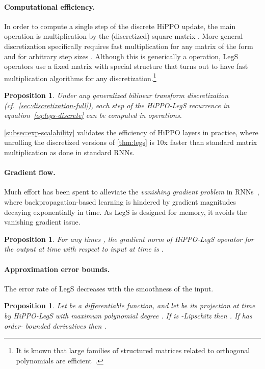 \documentclass{article}
\newtheorem{proposition}[theorem]{Proposition}
\begin{document}
\paragraph{Computational efficiency.}
In order to compute a single step of the discrete HiPPO update, the main operation is multiplication by the (discretized) square matrix .
More general discretization specifically requires fast multiplication for any matrix of the form  and  for arbitrary step sizes .
Although this is generically a  operation, LegS operators use a fixed  matrix with special structure
that turns out to have fast multiplication algorithms for any discretization.\footnote{It is known that large families of structured matrices related to orthogonal polynomials are efficient~\cite{de2018two}.}
\begin{proposition}\label{prop:efficiency}
    Under any generalized bilinear transform discretization (cf.\
    \cref{sec:discretization-full}), each step of the HiPPO-LegS recurrence in equation~\eqref{eq:legs-discrete} can be computed in  operations.
\end{proposition}

\cref{subsec:exp-scalability} validates the efficiency of HiPPO layers in practice, where unrolling the discretized versions of \cref{thm:legs} is 10x faster than standard matrix multiplication as done in standard RNNs.

\paragraph{Gradient flow.}
Much effort has been spent to alleviate the \emph{vanishing gradient problem} in RNNs~\cite{pascanu2013difficulty},
where backpropagation-based learning is hindered by gradient magnitudes decaying exponentially in time.
As LegS is designed for memory, it avoids the vanishing gradient issue.
\begin{proposition}\label{prop:gradient-bound}
    For any times , the gradient norm of HiPPO-LegS operator
    for the output at time  with respect to input at time  is
    .
\end{proposition}


\paragraph{Approximation error bounds.}
The error rate of LegS decreases with the smoothness of the input.

\begin{proposition}\label{prop:approximation_error}
  Let  be a differentiable function, and let
   be its projection at time  by
  HiPPO-LegS with maximum polynomial degree .
  If  is -Lipschitz then .
  If  has order- bounded derivatives then
  .
\end{proposition}
\end{document}
